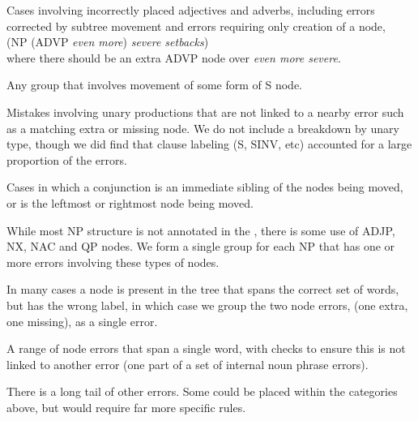 \begin{description}\itemsep1pt

	\item[ Modifier Attachment] Cases involving incorrectly placed adjectives
	and adverbs, including errors corrected by subtree movement and errors
	requiring only creation of a node, \myeg \\ (NP (ADVP \emph{even more})
	\emph{severe setbacks}) \\ where there should be an extra ADVP node over
	\emph{even more severe}.
	\item[ Clause Attachment] Any group that involves movement of some form of
	S node.

	\item[ Unary] Mistakes involving unary productions that are not linked to
	a nearby error  such as a matching extra or missing node.  We do not include
	a breakdown by unary type, though we did find that clause labeling (S, SINV,
	etc) accounted for a large proportion of the errors.

	\item[ Coordination] Cases in which a conjunction is an immediate sibling
	of the nodes being moved, or is the leftmost or rightmost node being moved.

	\item[ NP Internal Structure]  While most NP structure is not annotated in
	the \ptb, there is some use of ADJP, NX, NAC and QP nodes.  We form a single
	group for each NP that has one or more errors involving these types of nodes.

	\item[ Different label] In many cases a node is present in the tree that
	spans the correct set of words, but has the wrong label, in which case we
	group the two node errors, (one extra, one missing), as a single error.

	\item[ Single word phrase] A range of node errors that span a single word,
	with checks to ensure this is not linked to another error (\myeg one part of a
	set of internal noun phrase errors).

	\item[ Other] There is a long tail of other errors.  Some could be placed
	within the categories above, but would require far more specific rules.
\end{description}

